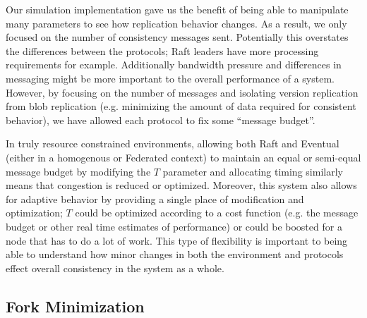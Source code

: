 \documentclass[10pt,conference,letterpaper]{IEEEtran}
\newcommand{\todo}[1]{{\textcolor{red}{#1}}}
\newcommand{\pjk}[1]{[\todo{PJK: #1}]}
\newcommand{\note}[1]{\textcolor{blue}{[#1]}}
\begin{document}
Our simulation implementation gave us the benefit of being able to manipulate many parameters to see how replication behavior changes. As a result, we only focused on the number of consistency messages sent. Potentially this overstates the differences between the protocols; Raft leaders have more processing requirements for example. Additionally bandwidth pressure and differences in messaging might be more important to the overall performance of a system. However, by focusing on the number of messages and isolating version replication from blob replication (e.g. minimizing the amount of data required for consistent behavior), we have allowed each protocol to fix some ``message budget''.

In truly resource constrained environments, allowing both Raft and Eventual (either in a homogenous or Federated context) to maintain an equal or semi-equal message budget by modifying the $T$ parameter and allocating timing similarly means that congestion is reduced or optimized. Moreover, this system also allows for adaptive behavior by providing a single place of modification and optimization; $T$ could be optimized according to a cost function (e.g. the message budget or other real time estimates of performance) or could be boosted for a node that has to do a lot of work. This type of flexibility is important to being able to understand how minor changes in both the environment and protocols effect overall consistency in the system as a whole.



\subsection{Fork Minimization}
\end{document}
